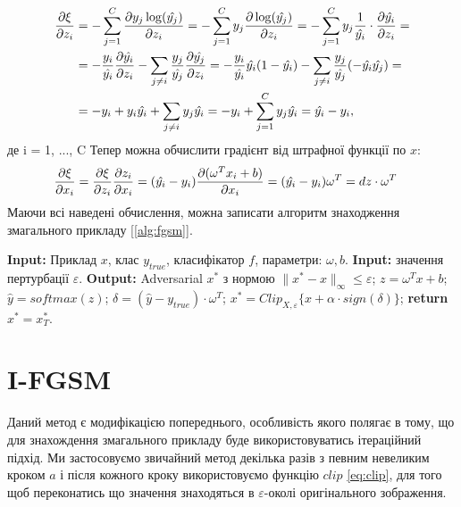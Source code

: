 \documentclass[a4paper,14pt]{extreport}
\renewcommand{\algorithmicrequire}{\textbf{Input: }}
\renewcommand{\algorithmicensure}{\textbf{Output: }}
\newcommand{\algorithmreturn}{\textbf{return }}
\newcommand{\tran}{^{T}}
\begin{document}
	\begin{align*}
		\pdv{\xi}{z_i} 
		&= 
		- \sum_{j=1}^{C} \pdv{ y_j \log (\hat{y_j})}{z_i} 
		=
		- \sum_{j=1}^{C} y_j \pdv{ \log (\hat{y_j})}{z_i} 
		= 
		- \sum_{j=1}^{C} y_j \frac{1}{\hat{y_i}} \cdot \pdv{\hat{y_i}}{z_i} 
		= \\& =
		- \frac{y_i}{\hat{y_i}} \pdv{\hat{y_i}}{z_i} - \sum_{j \neq i} \frac{y_j}{\hat{y_j}} \pdv{\hat{y_j}}{z_i} 
		= 
		-\frac{y_i}{\hat{y_i}} \hat{y_i} (1 - \hat{y_i}) - \sum_{j \neq i} \frac{y_j}{\hat{y_j}} (-\hat{y_i} \hat{y_j}) 
		= \\& =
		-y_i + y_i \hat{y_i} + \sum_{j \neq i} y_j \hat{y_i}
		= 
		-y_i + \sum_{j=1}^{C} y_j \hat{y_i} 
		=
		\hat{y_i} - y_i ,
	\end{align*}
	\endgroup
	де i = 1, ..., C
	\newline	
	Тепер можна обчислити градієнт від штрафної функції по $x$:
	\begin{align}
		\pdv{\xi}{x_i} 
		&=
		\pdv{\xi}{z_i} \pdv{z_i}{x_i} 
		=
		(\hat{y_i} - y_i) \pdv{(\omega\tran x_i+ b)}{x_i} 
		=
		(\hat{y_i} - y_i) \omega\tran 
		=
		dz \cdot \omega\tran
	\end{align}
	 Маючи всі наведені обчислення, можна записати алгоритм знаходження змагального прикладу [\ref{alg:fgsm}].
	\begin{algorithm}
		\caption{$FGSM$}
		\label{alg:fgsm}
		\begin{algorithmic}[1]
			\State \algorithmicrequire{Приклад $x$, клас $y_{true}$, класифікатор $f$, параметри: $\omega, b$.}
			\State \algorithmicrequire{значення пертурбації $\varepsilon$.}
			\State \algorithmicensure{ Adversarial $x^{*}$ з нормою $\|x^{*} - x\|_{\infty} \leq \varepsilon $;}
			\State $z = \omega\tran x + b$;
			\State $\hat{y} = softmax(z)$;
			\State $\delta = (\hat{y} - y_{true}) \cdot \omega\tran$;
			\State $x^{*} = Clip_{X, \varepsilon} \big\{ x + \alpha \cdot sign( \delta ) \big\}$;
			\State \algorithmreturn{$x^{*} = x^{*}_{T}$}.
		\end{algorithmic}
	\end{algorithm}
	
	\section{I-FGSM}
	Даний метод є модифікацією попереднього, особливість якого полягає в тому, що для знахождення змагального прикладу буде використовуватись ітераційний підхід.	Ми застосовуємо звичайний метод декілька разів з певним невеликим кроком $a$ і після кожного кроку використовуємо функцію $clip$ \ref{eq:clip}, для того щоб переконатись що значення знаходяться в $\varepsilon$-околі оригінального зображення.
\end{document}
